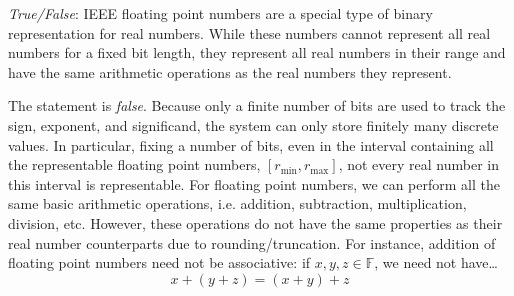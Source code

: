\documentclass[11pt,letterpaper]{article}
\begin{document}
\quizsol \textit{True/False}: IEEE floating point numbers are a special type of binary representation for real numbers. While these numbers cannot represent all real numbers for a fixed bit length, they represent all real numbers in their range and have the same arithmetic operations as the real numbers they represent. \pspace

\sol The statement is \textit{false}. Because only a finite number of bits are used to track the sign, exponent, and significand, the system can only store finitely many discrete values. In particular, fixing a number of bits, even in the interval containing all the representable floating point numbers, $[r_{\text{min}}, r_{\text{max}}]$, not every real number in this interval is representable. For floating point numbers, we can perform all the same basic arithmetic operations, i.e. addition, subtraction, multiplication, division, etc. However, these operations do not have the same properties as their real number counterparts due to rounding/truncation. For instance, addition of floating point numbers need not be associative: if $x, y, z \in \mathbb{F}$, we need not have\dots
	\[
	x + (y + z)= (x + y) + z
	\]
\end{document}
